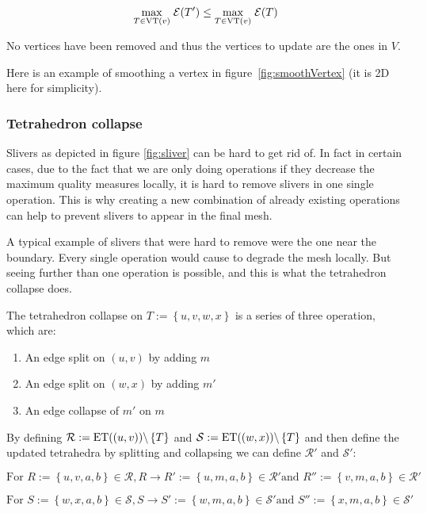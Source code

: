 \documentclass[11pt]{article}
\begin{document}
$$\underset{T\in\mathrm{VT}(v)}{\max}\;\mathcal{E}(T')\leq\underset{T\in\mathrm{VT}(v)}{\max}\;\mathcal{E}(T)$$

No vertices have been removed and thus the vertices to update are the ones in $V$.

Here is an example of smoothing a vertex in figure~\ref{fig:smoothVertex} (it is 2D here for simplicity).




\subsubsection{Tetrahedron collapse}\label{sec:tetrahedronCollapse}



Slivers as depicted in figure \ref{fig:sliver} can be hard to get rid of. In fact in certain cases, due to the
fact that we are only doing operations if they decrease the maximum quality measures locally, it is hard to
remove slivers in one single operation. This is why creating a new combination of already existing operations
can help to prevent slivers to appear in the final mesh.

A typical example of slivers that were hard to remove were the one near the boundary. Every single operation
would cause to degrade the mesh locally. But seeing further than one operation is possible, and this is what
the tetrahedron collapse does.

The tetrahedron collapse on $T := \left\{u,v,w,x\right\}$ is a series of three operation, which are:

\begin{enumerate}
	\item An edge split on $(u,v)$ by adding $m$
	\item An edge split on $(w,x)$ by adding $m'$
	\item An edge collapse of $m'$ on $m$
\end{enumerate}

By defining $\mathcal{R} := \mathrm{ET}((u,v)) \backslash \left\{T\right\}$ and $\mathcal{S} := \mathrm{ET}((w,x))\backslash
	\left\{T\right\}$ and then define the updated tetrahedra by splitting and collapsing we can define
$\mathcal{R}'$ and $\mathcal{S}'$:

$$\text{For }R := \left\{u,v,a,b\right\}\in\mathcal{R}, R\longrightarrow R':=\left\{u,m,a,b\right\}\in\mathcal{R}'\text{
		and }R'':=\left\{v,m,a,b\right\}\in\mathcal{R}' $$

$$\text{For }S := \left\{w,x,a,b\right\}\in\mathcal{S}, S\longrightarrow
	S':=\left\{w,m,a,b\right\}\in\mathcal{S}'\text{
		and }S'':=\left\{x,m,a,b\right\}\in\mathcal{S}' $$
\end{document}
